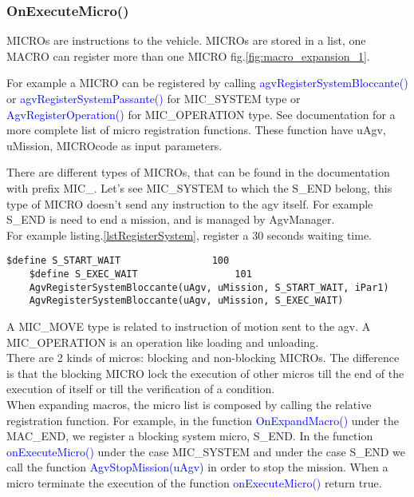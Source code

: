 

\subsubsection{OnExecuteMicro()}

MICROs are instructions to the vehicle. MICROs are stored in a list, one MACRO can register more than one MICRO fig.\ref{fig:macro_expansion_1}.

For example a MICRO can be registered by calling \textcolor{blue}{agvRegisterSystemBloccante()} or  \textcolor{blue}{agvRegisterSystemPassante()} for MIC\_SYSTEM type or \textcolor{blue}{AgvRegisterOperation()} for MIC\_OPERATION type. See documentation for a more complete list of micro registration functions.
These function have uAgv, uMission, MICROcode as input parameters.

There are different types of MICROs, that can be found in the documentation with prefix MIC\_. Let's see MIC\_SYSTEM to which the S\_END belong, this type of MICRO doesn't send any instruction to the agv itself. For example S\_END is need to end a mission, and is managed by AgvManager.\\

For example listing.\ref{lstRegisterSystem}, register a 30 seconds waiting time.

\begin{lstlisting}[caption=Wait time system micro ,label=lstRegisterSystem]
	$define S_START_WAIT				100
	$define S_EXEC_WAIT					101
	AgvRegisterSystemBloccante(uAgv, uMission, S_START_WAIT, iPar1)
	AgvRegisterSystemBloccante(uAgv, uMission, S_EXEC_WAIT)
\end{lstlisting}
	

A MIC\_MOVE type is related to instruction of motion sent to the agv. A MIC\_OPERATION is an operation like loading and unloading. \\

There are 2 kinds of micros: blocking and non-blocking MICROs. The difference is that the blocking MICRO lock the execution of other micros till the end of the execution of itself or till the verification of a condition. \\

When expanding macros, the micro list is composed by calling the relative registration function.
For example, in the function \textcolor{blue}{OnExpandMacro()} under the MAC\_END, we register a blocking system micro, S\_END.
In the function \textcolor{blue}{onExecuteMicro()} under the case MIC\_SYSTEM and under the case S\_END we call the function \textcolor{blue}{AgvStopMission(uAgv)} in order to stop the mission. When a micro terminate the execution of the function \textcolor{blue}{onExecuteMicro()} return true. \\

